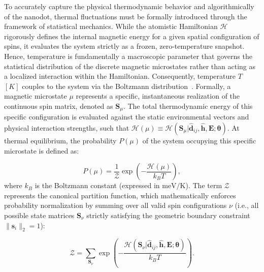 \documentclass[final,5p,times,twocolumn]{elsarticle}
\begin{document}
To accurately capture the physical thermodynamic behavior and algorithmically  of the nanodot, thermal fluctuations must be formally introduced through the framework of statistical mechanics. While the atomistic Hamiltonian $\mathcal{H}$ rigorously defines the internal magnetic energy for a given spatial configuration of spins, it evaluates the system strictly as a frozen, zero-temperature snapshot. Hence, temperature is fundamentally a macroscopic parameter that governs the statistical distribution of the discrete magnetic microstates rather than acting as a localized interaction within the Hamiltonian. Consequently, temperature $T$ $[K]$ couples to the system via the Boltzmann distribution~\cite{eriksson2017atomistic}. Formally, a magnetic microstate $\mu$ represents a specific, instantaneous realization of the continuous spin matrix, denoted as $\mathbf{S}_\mu$. The total thermodynamic energy of this specific configuration is evaluated against the static environmental vectors and physical interaction strengths, such that $\mathcal{H}(\mu) \equiv \mathcal{H}\left(\mathbf{S}_\mu|\mathbf{\hat{d}}_{ij},\hat{\mathbf{h}},\mathbf{E};\boldsymbol{\theta}\right)$. At thermal equilibrium, the probability $P(\mu)$ of the system occupying this specific microstate is defined as:

\begin{equation}\label{eq:Boltzmann}
P(\mu) = \frac{1}{\mathcal{Z}} \exp\left(-\frac{\mathcal{H}(\mu)}{k_B T}\right),
\end{equation}
where $k_B$ is the Boltzmann constant (expressed in $\text{meV/K}$). The term $\mathcal{Z}$ represents the canonical partition function, which mathematically enforces probability normalization by summing over all valid spin configurations $\nu$ (i.e., all possible state matrices $\mathbf{S}_\nu$ strictly satisfying the geometric boundary constraint $\|\mathbf{s}_i\|_2 = 1$):

\begin{equation}\label{eq:PartitionFunction}
\mathcal{Z} = \sum_{\mathbf{S}_\nu} \exp\left(-\frac{\mathcal{H}\left(\mathbf{S}_\nu|\mathbf{\hat{d}}_{ij},\hat{\mathbf{h}},\mathbf{E};\boldsymbol{\theta}\right)}{k_B T}\right).
\end{equation}
\end{document}
